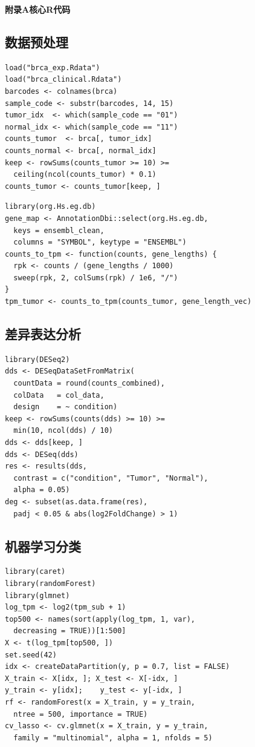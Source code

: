 \documentclass[12pt,a4paper]{article}
\begin{document}
\newpage
\begin{center}
\textbf{附录A\quad 核心R代码}
\end{center}

\subsection{数据预处理}

\begin{lstlisting}[caption={加载数据与样本分类}]
load("brca_exp.Rdata")
load("brca_clinical.Rdata")
barcodes <- colnames(brca)
sample_code <- substr(barcodes, 14, 15)
tumor_idx  <- which(sample_code == "01")
normal_idx <- which(sample_code == "11")
counts_tumor  <- brca[, tumor_idx]
counts_normal <- brca[, normal_idx]
keep <- rowSums(counts_tumor >= 10) >=
  ceiling(ncol(counts_tumor) * 0.1)
counts_tumor <- counts_tumor[keep, ]
\end{lstlisting}

\begin{lstlisting}[caption={基因标识符映射与TPM标准化}]
library(org.Hs.eg.db)
gene_map <- AnnotationDbi::select(org.Hs.eg.db,
  keys = ensembl_clean,
  columns = "SYMBOL", keytype = "ENSEMBL")
counts_to_tpm <- function(counts, gene_lengths) {
  rpk <- counts / (gene_lengths / 1000)
  sweep(rpk, 2, colSums(rpk) / 1e6, "/")
}
tpm_tumor <- counts_to_tpm(counts_tumor, gene_length_vec)
\end{lstlisting}

\subsection{差异表达分析}

\begin{lstlisting}[caption={DESeq2差异表达分析}]
library(DESeq2)
dds <- DESeqDataSetFromMatrix(
  countData = round(counts_combined),
  colData   = col_data,
  design    = ~ condition)
keep <- rowSums(counts(dds) >= 10) >=
  min(10, ncol(dds) / 10)
dds <- dds[keep, ]
dds <- DESeq(dds)
res <- results(dds,
  contrast = c("condition", "Tumor", "Normal"),
  alpha = 0.05)
deg <- subset(as.data.frame(res),
  padj < 0.05 & abs(log2FoldChange) > 1)
\end{lstlisting}

\subsection{机器学习分类}

\begin{lstlisting}[caption={Random Forest与LASSO分类}]
library(caret)
library(randomForest)
library(glmnet)
log_tpm <- log2(tpm_sub + 1)
top500 <- names(sort(apply(log_tpm, 1, var),
  decreasing = TRUE))[1:500]
X <- t(log_tpm[top500, ])
set.seed(42)
idx <- createDataPartition(y, p = 0.7, list = FALSE)
X_train <- X[idx, ]; X_test <- X[-idx, ]
y_train <- y[idx];    y_test <- y[-idx, ]
rf <- randomForest(x = X_train, y = y_train,
  ntree = 500, importance = TRUE)
cv_lasso <- cv.glmnet(x = X_train, y = y_train,
  family = "multinomial", alpha = 1, nfolds = 5)
\end{lstlisting}
\end{document}
